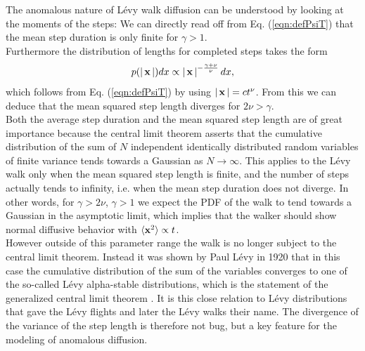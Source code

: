 The anomalous nature of L\'evy walk diffusion can be understood by looking at the moments of the steps: We can directly read off from Eq. (\ref{eqn:defPsiT}) that the mean step duration is only finite for $\gamma>1$. \\
Furthermore the distribution of lengths for completed steps takes the form 
%
\begin{align}
p(\left|\,\mathbf{ x }\,\right|) dx \propto \left|\,\mathbf{ x }\,\right|^{-\frac{\gamma+\nu}{\nu}} dx ,
\end{align}
%
which follows from Eq. (\ref{eqn:defPsiT}) by using $\left|\,\mathbf{ x }\,\right| = c t^{\nu}$. From this we can deduce that the mean squared step length diverges for $2\nu > \gamma$. \\
Both the average step duration and the mean squared step length are of great importance because the central limit theorem asserts that the cumulative distribution of the sum of $N$ independent identically distributed random variables of finite variance tends towards a Gaussian as $N \to \infty$. This applies to the L\'evy walk only when the mean squared step length is finite, and the number of steps actually tends to infinity, i.e. when the mean step duration does not diverge. In other words, for $\gamma > 2 \nu$, $\gamma >1$ we expect the \gls*{PDF} of the walk to tend towards a Gaussian in the asymptotic limit, which implies that the walker should show normal diffusive behavior with $\langle \mathbf{ x }^2 \rangle \propto t$. \\
However outside of this parameter range the walk is no longer subject to the central limit theorem. Instead it was shown by Paul L\'evy in 1920 that in this case the cumulative distribution of the sum of the variables converges to one of the so-called L\'evy alpha-stable distributions, which  is the statement of the generalized central limit theorem 
\cite{lwreview}. 
It is this close relation to L\'evy distributions that gave the L\'evy flights and later the L\'evy walks their name. The divergence of the variance of the step length is therefore not bug, but a key feature for the modeling of anomalous diffusion. 

